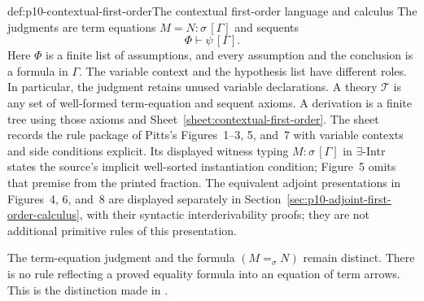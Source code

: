 \begin{hbdefinition}{def:p10-contextual-first-order}{The contextual first-order language and calculus}
The judgments are term equations \(M=N:\sigma\,[\Gamma]\) and sequents
\[
                         \Phi\vdash\psi\,[\Gamma].
\]
Here \(\Phi\) is a finite list of assumptions, and every assumption
and the conclusion is a formula in \(\Gamma\).
The variable context and the hypothesis list have different roles.
In particular, the judgment retains unused variable declarations.
A theory \(\mathcal T\) is any set of well-formed term-equation and
sequent axioms. A derivation is a finite tree using those axioms and
Sheet~\ref{sheet:contextual-first-order}.
The sheet records the rule package of Pitts's Figures~1--3, 5,
and~7 with variable contexts and side conditions explicit.
Its displayed witness typing \(M:\sigma\,[\Gamma]\) in
\(\exists\)-Intr states the source's implicit well-sorted
instantiation condition; Figure~5 omits that premise from the printed
fraction. The equivalent adjoint presentations in Figures~4, 6,
and~8 are displayed separately in
Section~\ref{sec:p10-adjoint-first-order-calculus}, with their
syntactic interderivability proofs; they are not additional
primitive rules of this presentation.
\end{hbdefinition}


The term-equation judgment and the formula \((M=_\sigma N)\) remain
distinct. There is no rule reflecting a proved equality formula into
an equation of term arrows. This is the distinction made in
\cite[\S5.6, Remark~5.6.7, p.~59]{Pitts1995Draft}.

